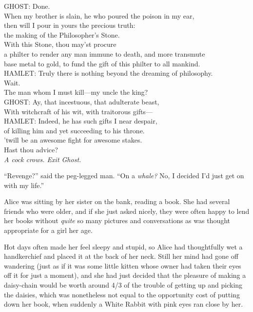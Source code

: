 \begin{playdialog}
GHOST: Done.\\
When my brother is slain, he who poured the poison in my ear,\\
then will I pour in yours the precious truth:\\
the making of the Philosopher’s Stone.\\
With this Stone, thou may’st procure\\
a philter to render any man immune to death, and more transmute\\ base metal to gold, to fund the gift of this philter to all mankind.\\

HAMLET: Truly there is nothing beyond the dreaming of philosophy.\\ Wait.\\ The man whom I must kill—my uncle the king?\\

GHOST: Ay, that incestuous, that adulterate beast,\\
With witchcraft of his wit, with traitorous gifts—\\

HAMLET: Indeed, he has such gifts I near despair,\\
of killing him and yet succeeding to his throne.\\
’twill be an awesome fight for awesome stakes.\\
Hast thou advice?\\

\emph{A cock crows. Exit Ghost.}
\end{playdialog}

“Revenge?” said the peg-legged man. “On a \emph{whale?} No, I decided I’d just get on with my life.”

Alice was sitting by her sister on the bank, reading a book. She had several friends who were older, and if she just asked nicely, they were often happy to lend her books without \emph{quite} so many pictures and conversations as was thought appropriate for a girl her age.

Hot days often made her feel sleepy and stupid, so Alice had thoughtfully wet a handkerchief and placed it at the back of her neck. Still her mind had gone off wandering (just as if it was some little kitten whose owner had taken their eyes off it for just a moment), and she had just decided that the pleasure of making a daisy-chain would be worth around 4/3 of the trouble of getting up and picking the daisies, which was nonetheless not equal to the opportunity cost of putting down her book, when suddenly a White Rabbit with pink eyes ran close by her.

